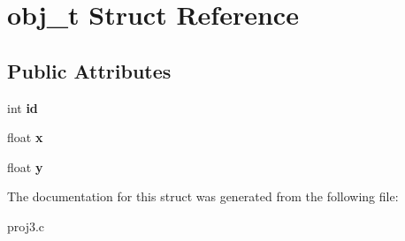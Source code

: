 \hypertarget{structobj__t}{}\section{obj\+\_\+t Struct Reference}
\label{structobj__t}
\subsection*{Public Attributes}
\begin{DoxyCompactItemize}
\item 
\hypertarget{structobj__t_a603ae185ae536cecefa2015ad574d4a3}{}int {\bfseries id}\label{structobj__t_a603ae185ae536cecefa2015ad574d4a3}

\item 
\hypertarget{structobj__t_af688845648ce2b4781c232c475d9fa81}{}float {\bfseries x}\label{structobj__t_af688845648ce2b4781c232c475d9fa81}

\item 
\hypertarget{structobj__t_a1101f5b48ee96a247c71aa8a33feb2bb}{}float {\bfseries y}\label{structobj__t_a1101f5b48ee96a247c71aa8a33feb2bb}

\end{DoxyCompactItemize}


The documentation for this struct was generated from the following file\+:\begin{DoxyCompactItemize}
\item 
proj3.\+c\end{DoxyCompactItemize}
